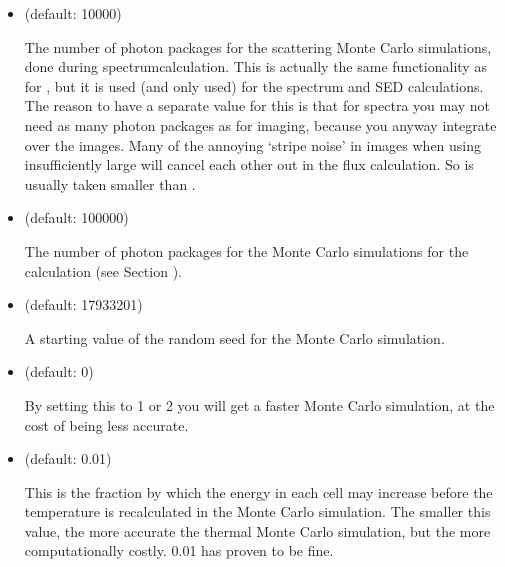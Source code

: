 \documentclass[letterpaper,10pt,english]{sphinxmanual}
\begin{document}
\begin{itemize}
\item {} 
 (default: 10000)

The number of photon packages for the scattering Monte Carlo simulations, done
during spectrum\sphinxhyphen{}calculation. This is actually the same functionality as for
, but it is used (and only used) for the spectrum and SED
calculations. The reason to have a separate value for this is that for spectra
you may not need as many photon packages as for imaging, because you anyway
integrate over the images. Many of the annoying ‘stripe noise’ in images when
using insufficiently large  will cancel each other out in the
flux calculation. So  is usually taken smaller than
.

\item {} 
 (default: 100000)

The number of photon packages for the Monte Carlo simulations for the
 calculation (see Section {\hyperref[\detokenize{dustradtrans:sec-dust-monochromatic-monte-carlo}]{}}).

\item {} 
 (default: \sphinxhyphen{}17933201) 

A starting value of the random seed for the Monte Carlo simulation.

\item {} 
 (default: 0) 

By setting this to 1 or 2 you will get a faster Monte Carlo simulation,
at the cost of being less accurate.

\item {} 
 (default: 0.01) 

This is the fraction by which the energy in each cell may increase
before the temperature is recalculated in the Monte Carlo simulation.
The smaller this value, the more accurate the thermal Monte Carlo
simulation, but the more computationally costly. 0.01 has proven to be
fine.


\end{itemize}
\end{document}

